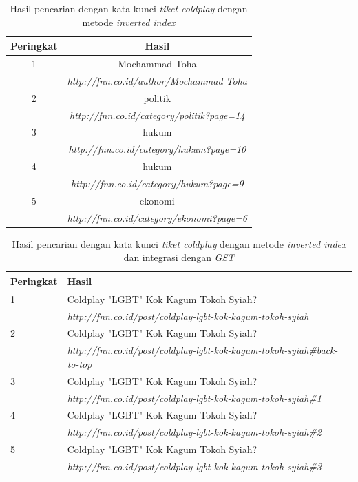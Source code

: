 
\begin{table}[H]
\begin{center}
  \caption{\label{tabel:hasil_inv_coldplay} Hasil pencarian dengan kata kunci
  \textit{tiket coldplay} dengan metode \textit{inverted index}}
\begin{tabular}{|c|c|} 
 \hline
  Peringkat & Hasil \\ 
 \hline
  1 & Mochammad Toha \\ 
   & \textit{http://fnn.co.id/author/Mochammad Toha} \\
 \hline
  2 & politik \\
   & \textit{http://fnn.co.id/category/politik?page=14} \\
 \hline
  3 & hukum \\
   & \textit{http://fnn.co.id/category/hukum?page=10} \\
 \hline
  4 & hukum \\
   & \textit{http://fnn.co.id/category/hukum?page=9} \\
 \hline
  5 & ekonomi \\
   & \textit{http://fnn.co.id/category/ekonomi?page=6} \\
 \hline
\end{tabular}
\end{center}
\end{table}

\begin{table}[H]
\begin{center}
  \caption{\label{tabel:hasil_gst_coldplay} Hasil pencarian dengan kata kunci
  \textit{tiket coldplay} dengan metode \textit{inverted index} dan integrasi dengan
  \textit{GST}}
  \begin{tabular}{|p{0.7in}|p{4.5in}|} 
 \hline
  Peringkat & Hasil \\ 
 \hline
  1 & Coldplay "LGBT" Kok Kagum Tokoh Syiah? \\ 
   & \textit{http://fnn.co.id/post/coldplay-lgbt-kok-kagum-tokoh-syiah} \\
 \hline
  2 & Coldplay "LGBT" Kok Kagum Tokoh Syiah? \\ 
   & \textit{http://fnn.co.id/post/coldplay-lgbt-kok-kagum-tokoh-syiah\#back-to-top} \\
 \hline
  3 & Coldplay "LGBT" Kok Kagum Tokoh Syiah? \\ 
   & \textit{http://fnn.co.id/post/coldplay-lgbt-kok-kagum-tokoh-syiah\#1} \\
 \hline
  4 & Coldplay "LGBT" Kok Kagum Tokoh Syiah? \\ 
   & \textit{http://fnn.co.id/post/coldplay-lgbt-kok-kagum-tokoh-syiah\#2} \\
 \hline
  5 & Coldplay "LGBT" Kok Kagum Tokoh Syiah? \\ 
   & \textit{http://fnn.co.id/post/coldplay-lgbt-kok-kagum-tokoh-syiah\#3} \\
 \hline
\end{tabular}
\end{center}
\end{table}

